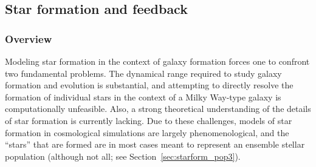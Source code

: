\subsection{Star formation and feedback}
\label{sec.ov.star}


\subsubsection{Overview}


Modeling star formation in the context of galaxy formation forces one
to confront two fundamental problems. The dynamical range required to
study galaxy formation and evolution is substantial, and attempting to
directly resolve the formation of individual stars in the context of a
Milky Way-type galaxy is computationally unfeasible.  Also, a strong
theoretical understanding of the details of star formation is
currently lacking.  Due to these challenges, models of star formation
in cosmological simulations are largely phenomenological, and the
``stars'' that are formed are in most cases meant to represent an
ensemble stellar population (although not all; see
Section~\ref{sec:starform_pop3}). 

